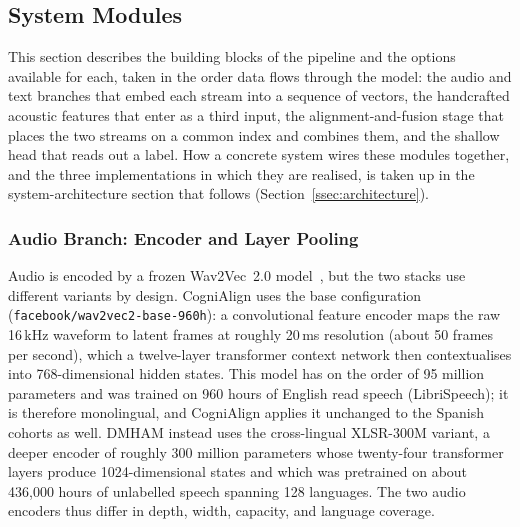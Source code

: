 \documentclass[a4paper,12pt]{article}
\begin{document}
\subsection{System Modules}
\label{ssec:modules}

This section describes the building blocks of the pipeline and the options available for each, taken in the order data flows through the model: the audio and text branches that embed each stream into a sequence of vectors, the handcrafted acoustic features that enter as a third input, the alignment-and-fusion stage that places the two streams on a common index and combines them, and the shallow head that reads out a label. How a concrete system wires these modules together, and the three implementations in which they are realised, is taken up in the system-architecture section that follows (Section~\ref{ssec:architecture}).

\subsubsection{Audio Branch: Encoder and Layer Pooling}
\label{sssec:acoustic_encoder}

Audio is encoded by a frozen Wav2Vec~2.0 model~\cite{baevski2020wav2vec}, but the two stacks use different variants by design. CogniAlign uses the base configuration (\texttt{facebook/wav2vec2-base-960h}): a convolutional feature encoder maps the raw 16\,kHz waveform to latent frames at roughly 20\,ms resolution (about 50 frames per second), which a twelve-layer transformer context network then contextualises into 768-dimensional hidden states. This model has on the order of 95 million parameters and was trained on 960 hours of English read speech (LibriSpeech); it is therefore monolingual, and CogniAlign applies it unchanged to the Spanish cohorts as well. DMHAM instead uses the cross-lingual XLSR-300M variant, a deeper encoder of roughly 300 million parameters whose twenty-four transformer layers produce 1024-dimensional states and which was pretrained on about 436{,}000 hours of unlabelled speech spanning 128 languages. The two audio encoders thus differ in depth, width, capacity, and language coverage.
\end{document}
